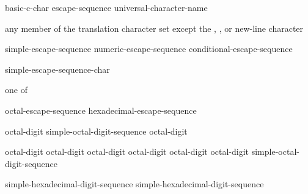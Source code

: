 \begin{bnf}
\br
    basic-c-char\br
    escape-sequence\br
    universal-character-name
\end{bnf}

\begin{bnf}
\br
    \textnormal{any member of the translation character set except the ,}\br
    \bnfindent\textnormal{, or new-line character}
\end{bnf}

\begin{bnf}
\br
    simple-escape-sequence\br
    numeric-escape-sequence\br
    conditional-escape-sequence
\end{bnf}

\begin{bnf}
\br
    \terminal{\textbackslash} simple-escape-sequence-char
\end{bnf}

\begin{bnf}
 \textnormal{one of}\br
\end{bnf}

\begin{bnf}
\br
    octal-escape-sequence\br
    hexadecimal-escape-sequence
\end{bnf}

\begin{bnf}
\br
    octal-digit\br
    simple-octal-digit-sequence octal-digit
\end{bnf}

\begin{bnf}
\br
    \terminal{\textbackslash} octal-digit\br
    \terminal{\textbackslash} octal-digit octal-digit\br
    \terminal{\textbackslash} octal-digit octal-digit octal-digit\br
     simple-octal-digit-sequence \terminal{\}}\br
\end{bnf}

\begin{bnf}
\br
     simple-hexadecimal-digit-sequence\br
     simple-hexadecimal-digit-sequence \terminal{\}}
\end{bnf}

